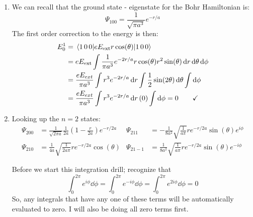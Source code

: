 \documentclass[11pt]{article}
\begin{document}
\begin{enumerate}[label=\alph*)]
\item We can recall that the ground state - eigenstate for the Bohr Hamiltonian is:
\[\Psi_{100} = \frac{1}{\sqrt{\pi a^3}}e^{-r/a}\]
The first order correction to the energy is then:
\begin{align*}
E_0^1 & = \ev{eE_{\text{ext}} r \cos(\theta)}{1 \, 0 \,0} \\
& = eE_{\text{ext}}\int\frac{1}{\pi	a^3}e^{-2r/a}r\cos(\theta)r^2\sin(\theta)\dd{r}\dd{\theta}\dd{\phi}\\
& = \frac{eE_{ext}}{\pi	a^3}\int r^3 e^{-2r/a}\dd{r}\int\frac{1}{2}\sin(2\theta)\dd{\theta}\int\dd{\phi}\\
& = \frac{eE_{ext}}{\pi	a^3}\int r^3 e^{-2r/a}\dd{r}(0)\int\dd{\phi} = 0 \qquad \checkmark
\end{align*}
\item Looking up the $n=2$ states:
\begin{align*}
\Psi_{200} & = \frac{1}{\sqrt{2\pi a}}\frac{1}{2a} \left(1 - \frac{r}{2a}\right)e^{-r/2a} & \Psi_{211} &= -\frac{1}{8a^2}\sqrt{\frac{1}{a\pi}}re^{-r/2a}\sin(\theta)e^{i\phi}\\
\Psi_{210} & = \frac{1}{4a}\sqrt{\frac{1}{2a\pi}}re^{-r/2a}\cos(\theta) & \Psi_{21-1} &= \frac{1}{8a^2}\sqrt{\frac{1}{a\pi}}re^{-r/2a}\sin(\theta)e^{-i\phi}
\end{align*}

Before we start this integration drill; recognize that 
\[\int_0^{2\pi}e^{i\phi}\dd{\phi} =\int_0^{2\pi}e^{-i\phi}\dd{\phi} =\int_0^{2\pi}e^{2i\phi}\dd{\phi} =0\]
So, any integrals that have any one of these terms will be automatically evaluated to zero. I will also be doing all zero terms first.


\end{enumerate}
\end{document}
